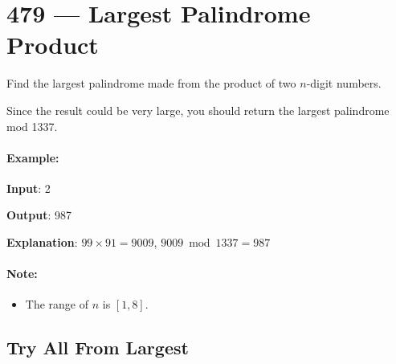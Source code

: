 \section{479 --- Largest Palindrome Product}
Find the largest palindrome made from the product of two $n$-digit numbers.

Since the result could be very large, you should return the largest palindrome mod 1337.
 

\paragraph{Example:}
\begin{flushleft}

\textbf{Input}: 2

\textbf{Output}: 987

\textbf{Explanation}: $99 \times 91 = 9009$, $9009 \bmod 1337 = 987$

\end{flushleft}
 

\paragraph{Note:}

\begin{itemize}
\item The range of $n$ is $[1,8]$.
\end{itemize}

\subsection{Try All From Largest}

